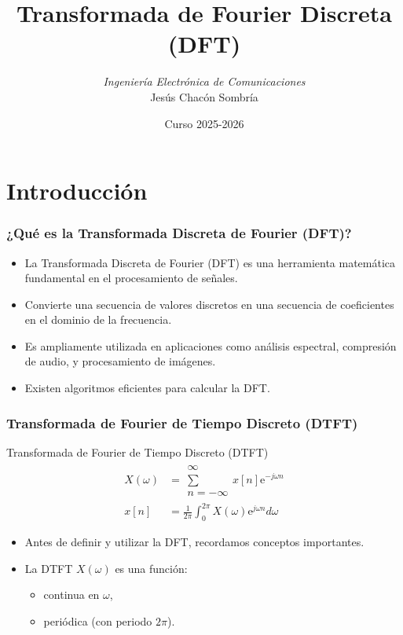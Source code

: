 \documentclass{beamer}
\title[Procesamiento de Señales]{Transformada de Fourier Discreta (DFT)}
\author[J. Chacón]{%
\textit{Ingeniería Electrónica de Comunicaciones }\\
\vspace{0.6cm}
\small Jesús Chacón Sombría}
\institute[DACYA] %
{

\footnotesize  Departamento de Arquitectura de Computadores y Automática.\\
  Universidad Complutense de Madrid
  }
\date[Transformada Fourier Discreta] %
{\footnotesize Curso 2025-2026}%
\newcommand{\MyLogo}{%
\begin{textblock}{14}(116.0,0.6)
  \pgfuseimage{logo}
\end{textblock}
}
\numberwithin{section}{part}
\begin{document}
\begin{frame}
  \titlepage
\end{frame}

\newcommand*\oldmacro{}%
\let\oldmacro\insertshorttitle%
\renewcommand*\insertshorttitle{%
 \MyLogo
  \oldmacro\hfill%
}

\AtBeginSection[]{}

\AtBeginSubsection[]{}      

\section{Introducción}

\begin{frame}
  \frametitle{¿Qué es la Transformada Discreta de Fourier (DFT)?}
  \begin{itemize}
      \item La Transformada Discreta de Fourier (DFT) es una herramienta matemática fundamental en el procesamiento de señales.
      \item Convierte una secuencia de valores discretos en una secuencia de coeficientes en el dominio de la frecuencia.
      \item Es ampliamente utilizada en aplicaciones como análisis espectral, compresión de audio, y procesamiento de imágenes.
      \item Existen algoritmos eficientes para calcular la DFT.
  \end{itemize}    
\end{frame}    

\begin{frame}
  \frametitle{Transformada de Fourier de Tiempo Discreto (DTFT)}
  \begin{alertblock}{Transformada de Fourier de Tiempo Discreto (DTFT)}
  \[
    \begin{aligned}
      X(\omega) &=\substack{\infty\\\sum\\n=-\infty}x[n]\text{e}^{-j\omega n}\\
      x[n] &=\frac{1}{2\pi}\int_0^{2\pi}X(\omega)\text{e}^{j\omega n}d\omega
    \end{aligned}
  \]
  \end{alertblock}
  
  \begin{itemize}
    \item Antes de definir y utilizar la DFT, recordamos conceptos importantes.
    \item La DTFT $X(\omega)$ es una función:
    \begin{itemize} 
      \item continua en $\omega$, 
      \item periódica (con periodo $2\pi$).
    \end{itemize}
  \end{itemize}

\end{frame}
\end{document}
